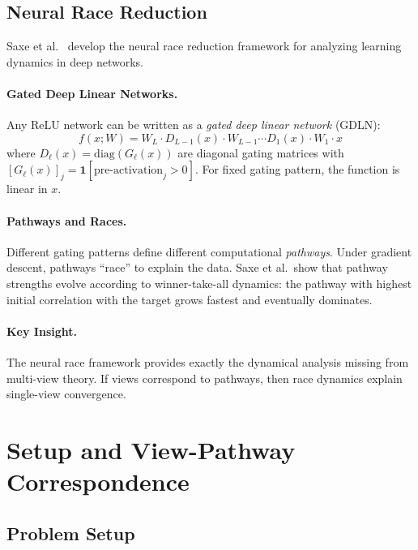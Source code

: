 \documentclass{article}
\begin{document}
\subsection{Neural Race Reduction}
\label{sec:race_background}

Saxe et al.~\cite{saxe2014exact,saxe2022neural} develop the neural race reduction framework for analyzing learning dynamics in deep networks.

\paragraph{Gated Deep Linear Networks.} Any ReLU network can be written as a \emph{gated deep linear network} (GDLN):
\begin{equation}
    f(x; W) = W_L \cdot D_{L-1}(x) \cdot W_{L-1} \cdots D_1(x) \cdot W_1 \cdot x
\end{equation}
where $D_\ell(x) = \text{diag}(G_\ell(x))$ are diagonal gating matrices with $[G_\ell(x)]_j = \mathbf{1}[\text{pre-activation}_j > 0]$. For fixed gating pattern, the function is linear in $x$.

\paragraph{Pathways and Races.} Different gating patterns define different computational \emph{pathways}. Under gradient descent, pathways ``race'' to explain the data. Saxe et al.~show that pathway strengths evolve according to winner-take-all dynamics: the pathway with highest initial correlation with the target grows fastest and eventually dominates.

\paragraph{Key Insight.} The neural race framework provides exactly the dynamical analysis missing from multi-view theory. If views correspond to pathways, then race dynamics explain single-view convergence.

\section{Setup and View-Pathway Correspondence}
\label{sec:setup}

\subsection{Problem Setup}
\end{document}
